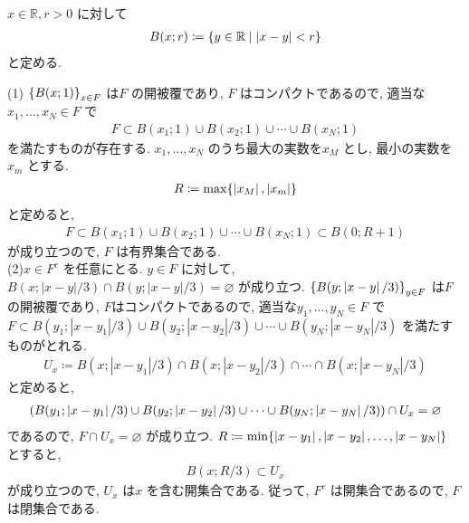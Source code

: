 \documentclass[10pt, fleqn, label-section=none]{bxjsarticle}
\title{}
\date{}
\author{}
\theoremstyle{definition}
\newcommand{\paren}[1]{\mleft( #1\mright )}
\newcommand{\cbra}[1]{\mleft\{#1\mright\}}
\newcommand{\abs}[1]{\left|#1\right|}
\renewcommand{\;}{\, ; \,}
\begin{document}
\maketitle

\section{}


$x \in \mathbb R, r >0$ に対して
\begin{align*}  B(x; r) \coloneqq \cbra{y \in \mathbb R \mid \abs{x -y} < r}  \end{align*}
と定める. 

(1) $\cbra{B(x; 1) }_{x \in F}$ は$F$ の開被覆であり, $F$ はコンパクトであるので, 
適当な$x_1, \ldots , x_N \in F$ で
\begin{align*} F \subset B(x_1; 1) \cup B(x_2; 1) \cup \cdots \cup B(x_N ; 1) \end{align*}
を満たすものが存在する. $x_1, \ldots, x_N$ のうち最大の実数を$x_M$ とし, 最小の実数を$x_m$ とする.
\begin{align*} R \coloneqq \max \cbra{ \abs{x_M}, \abs{x_m}}\end{align*}
と定めると, 
\begin{align*} F \subset B(x_1; 1) \cup B(x_2; 1) \cup \cdots \cup B(x_N ; 1)  \subset B(0; R+1)\end{align*}
が成り立つので, $F$ は有界集合である. 
\\

(2)$x \in F^c$ を任意にとる. $y \in F$ に対して, $B(x; \abs{x-y}/3) \cap B(y; \abs{x-y}/3) = \varnothing$ が成り立つ. $\cbra{B(y; \abs{x-y}/3)}_{y \in F}$ は$F$ の開被覆であり, $F$はコンパクトであるので, 
適当な$y_1, \ldots, y_N \in F$ で$F \subset B(y_1; \abs{x - y_1}/3) \cup B(y_2; \abs{x - y_2}/3)  \cup \cdots \cup B(y_N; \abs{x - y_N}/3) $ を満たすものがとれる. 
\begin{align*} U_x \coloneqq  B(x; \abs{x - y_1}/3) \cap B(x; \abs{x - y_2}/3) \cap \cdots \cap B(x; \abs{x - y_N}/3)  \end{align*}
と定めると, 
\begin{align*} \paren{B(y_1; \abs{x - y_1}/3) \cup B(y_2; \abs{x - y_2}/3)  \cup \cdots \cup B(y_N; \abs{x - y_N}/3) } \cap U_x = \varnothing \end{align*}
であるので, $F \cap U_x = \varnothing $ が成り立つ. $R \coloneqq \min \cbra{\abs{x - y_1}, \abs{x - y_2}, \ldots, \abs{x - y_N} }$ とすると, 
\begin{align*} B(x; R/3) \subset U_x\end{align*}
が成り立つので, $U_x$ は$x$ を含む開集合である. 従って, $F^c$ は開集合であるので, $F$ は閉集合である. \\
\end{document}
